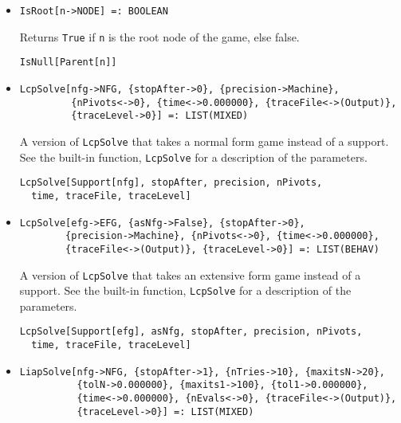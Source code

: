 \begin{itemize}
\item{}
\protect \large \begin{verbatim}
IsRoot[n->NODE] =: BOOLEAN 
\end{verbatim}\normalsize

\bd 
Returns \verb+True+ if \verb+n+ is the root node of the game, else
false.  
\begin{verbatim}
IsNull[Parent[n]]
\end{verbatim} 
\ed




\item{}
\protect \large \begin{verbatim}
LcpSolve[nfg->NFG, {stopAfter->0}, {precision->Machine}, 
         {nPivots<->0}, {time<->0.000000}, {traceFile<->(Output)}, 
         {traceLevel->0}] =: LIST(MIXED) 
\end{verbatim}\normalsize

\bd 
A version of \verb+LcpSolve+ that takes a normal form
game instead of a support.  See the built-in function,
\verb+LcpSolve+ for a description of the parameters.
\begin{verbatim}
LcpSolve[Support[nfg], stopAfter, precision, nPivots,
  time, traceFile, traceLevel]
\end{verbatim} 
\ed

\item{}
\protect \large \begin{verbatim}
LcpSolve[efg->EFG, {asNfg->False}, {stopAfter->0}, 
        {precision->Machine}, {nPivots<->0}, {time<->0.000000}, 
        {traceFile<->(Output)}, {traceLevel->0}] =: LIST(BEHAV) 
\end{verbatim}\normalsize

\bd 
A version of \verb+LcpSolve+ that takes an extensive form
game instead of a support.  See the built-in function,
\verb+LcpSolve+ for a description of the parameters.
\begin{verbatim}
LcpSolve[Support[efg], asNfg, stopAfter, precision, nPivots,
  time, traceFile, traceLevel]
\end{verbatim} 
\ed

\item{}
\protect \large \begin{verbatim}
LiapSolve[nfg->NFG, {stopAfter->1}, {nTries->10}, {maxitsN->20}, 
          {tolN->0.000000}, {maxits1->100}, {tol1->0.000000}, 
          {time<->0.000000}, {nEvals<->0}, {traceFile<->(Output)}, 
          {traceLevel->0}] =: LIST(MIXED) 
\end{verbatim}\normalsize


\end{itemize}
